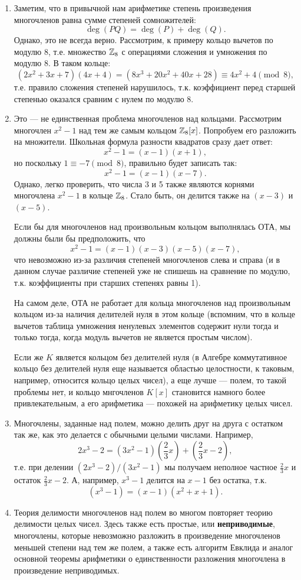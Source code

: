 \begin{enumerate}
\item Заметим, что в привычной нам арифметике степень произведения многочленов равна сумме степеней сомножителей:
$$
\deg(PQ)=\deg(P)+\deg(Q).
$$
Однако, это не всегда верно. Рассмотрим, к примеру кольцо вычетов по модулю $8$, т.е. множество $\mathbb Z_8$ с операциями сложения и умножения по модулю $8$. В таком кольце:
$$
(2x^2+3x+7)(4x+4) = (8x^3+20x^2+40x+28) \equiv 4x^2+4\pmod 8,
$$
т.е. правило сложения степеней нарушилось, т.к. коэффициент перед старшей степенью оказался сравним с нулем по модулю $8$.
\item Это --- не единственная проблема многочленов над кольцами. Рассмотрим многочлен $x^2-1$ над тем же самым кольцом $\mathbb Z_8[x]$.
Попробуем его разложить на множители. Школьная формула разности квадратов сразу дает ответ:
$$
x^2-1=(x-1)(x+1),
$$
но поскольку $1\equiv -7\pmod 8$, правильно будет записать так:
$$
x^2-1=(x-1)(x-7).
$$
Однако, легко проверить, что числа 3 и 5 также являются корнями многочлена $x^2-1$ в кольце $\mathbb Z_8$. Стало быть, он делится также на $(x-3)$ и $(x-5)$.

Если бы для многочленов над произвольным кольцом выполнялась ОТА, мы должны были бы предположить, что
$$
x^2-1=(x-1)(x-3)(x-5)(x-7),
$$
что невозможно из-за различия степеней многочленов слева и справа (и в данном случае различие степеней уже не спишешь на сравнение по модулю, т.к. коэффициенты при старших степенях равны 1).

На самом деле, ОТА не работает для кольца многочленов над произвольным кольцом из-за наличия делителей нуля в этом кольце (вспомним, что в кольце вычетов таблица умножения ненулевых элементов содержит нули тогда и только тогда, когда модуль вычетов не является простым числом).

Если же $K$ является кольцом без делителей нуля (в Алгебре коммутативное кольцо без делителей нуля еще называется областью целостности, к таковым, например, относится кольцо целых чисел), а еще лучше --- полем, то такой проблемы нет, и кольцо мнгочленов $K[x]$ становится намного более привлекательным, а его арифметика --- похожей на арифметику целых чисел.

\item Многочлены, заданные над полем, можно делить друг на друга с остатком так же, как это делается с обычными целыми числами. Например, 
$$
2x^3-2=(3x^2-1)\left(\frac23x\right) + \left(\frac23x-2\right),
$$
т.е. при делении $(2x^3-2)/(3x^2-1)$ мы получаем неполное частное $\frac23x$ и остаток $\frac23x-2$. А, например, $x^3-1$ делится на $x-1$ без остатка, т.к.
$$
(x^3-1)=(x-1)(x^2+x+1).
$$
\item Теория делимости многочленов над полем во многом повторяет теорию делимости целых чисел. Здесь также есть простые, или \textbf{неприводимые}, многочлены, которые невозможно разложить в произведение многочленов меньшей степени над тем же полем, а также есть алгоритм Евклида и аналог основной теоремы арифметики о единственности разложения многочлена в произведение неприводимых.


\end{enumerate}

